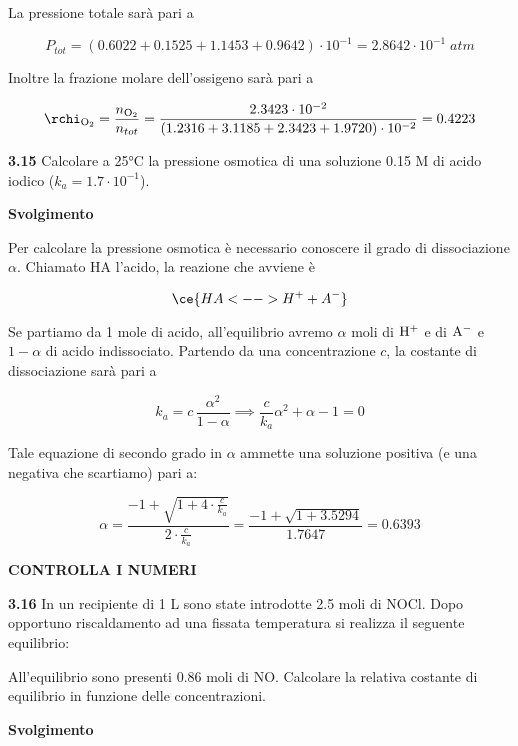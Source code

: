 La pressione totale sarà pari a

$$P_{tot}=(0.6022 + 0.1525 + 1.1453 + 0.9642) \cdot 10^{-1}=2.8642 \cdot 10^{-1}\;atm$$

Inoltre la frazione molare dell'ossigeno sarà pari a

$$\rchi_{\rm O_2}=\frac{n_{\rm O_2}}{n_{tot}}=\frac{2.3423 \cdot 10^{-2}}{(1.2316 + 3.1185 + 2.3423 + 1.9720) \cdot 10^{-2}}=0.4223$$

\vspace{0.2cm}\textbf{3.15} Calcolare a 25°C la pressione osmotica di una soluzione 0.15 M di acido iodico ($k_a=1.7 \cdot 10^{-1}$).

\vspace{0.2cm}\large\textbf{Svolgimento}\normalsize

\vspace{0.2cm}Per calcolare la pressione osmotica è necessario conoscere il grado di dissociazione $\alpha$. Chiamato HA l'acido, la reazione che avviene è

$$\ce{HA <--> H^+ + A^-}$$

Se partiamo da 1 mole di acido, all'equilibrio avremo $\alpha$ moli di $\rm H^+$ e di $\rm A^-$ e $1-\alpha$ di acido indissociato. Partendo da una concentrazione $c$, la costante di dissociazione sarà pari a

$$k_a=c\,\frac{\alpha^2}{1-\alpha}
\implies
\frac{c}{k_a}\alpha^2 + \alpha -1=0$$

Tale equazione di secondo grado in $\alpha$ ammette una soluzione positiva (e una negativa che scartiamo) pari a:

$$\alpha=\frac{-1 + \sqrt{1 + 4 \cdot \displaystyle \frac{c}{k_a}}}{2 \cdot \displaystyle \frac{c}{k_a}}
=\frac{-1 + \sqrt{1 + 3.5294}}{1.7647}=0.6393$$

\textbf{CONTROLLA I NUMERI}

\vspace{0.2cm}\textbf{3.16} In un recipiente di 1 L sono state introdotte 2.5 moli di NOCl. Dopo opportuno riscaldamento ad una fissata temperatura si realizza il seguente equilibrio:

\begin{center}
\end{center}

All'equilibrio sono presenti 0.86 moli di NO. Calcolare la relativa costante di equilibrio in funzione delle concentrazioni.

\vspace{0.2cm}\large\textbf{Svolgimento}\normalsize

